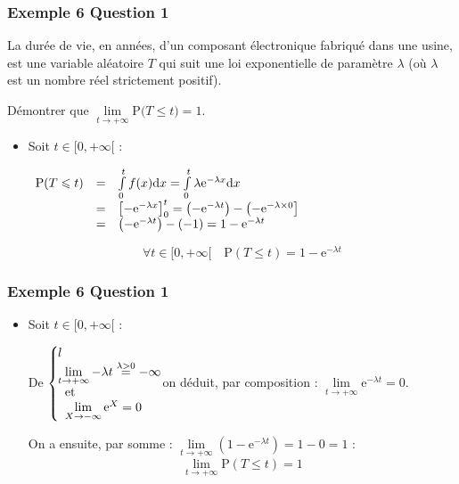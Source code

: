 \documentclass[xcolor=svgnames,t,final]{beamer}
\newcommand{\proba}[1]{\text{P}\big(#1\big)}
\newcommand{\sys}[2]{
\left\lbrace
 \begin{array}{l}
  \negthickspace\negthickspace #1\\
  \negthickspace\negthickspace #2\\
 \end{array}
\right.\negthickspace\negthickspace}
\begin{document}
\begin{frame}


\frametitle{Exemple 6 Question 1}
\label{exemple6}


La durée de vie, en années, d'un composant électronique fabriqué dans une usine, est une variable aléatoire $T$ qui suit une loi exponentielle de paramètre $\lambda$ (où $\lambda$ est un nombre réel strictement positif).

Démontrer que $\lim\limits_{t \to + \infty} \proba{T \leqslant t}=1$.

\begin{itemize}
\item Soit $t\in[0,+\infty[$ :

$\begin{array}[t]{lcl}
\text{P}(T\leqslant t)&=&\int\limits_{0}^{t}f(x)\text{d}x=\int\limits_{0}^{t}\lambda \text{e}^{-\lambda x}\text{d}x\\
&=&\left[ -\text{e}^{-\lambda x}\right]_{0}^{t}=\left( -\text{e}^{-\lambda t}\right)-\left( -\text{e}^{-\lambda \times 0}\right]\\ 
&=&\left( -\text{e}^{-\lambda t}\right)-(-1) =1-\text{e}^{-\lambda t}   
\end{array}$	

	
\[ \forall t\in[0,+\infty[\quad \text{P}(T\leqslant t)=1-\text{e}^{-\lambda t}\]

\end{itemize}


\end{frame}


\begin{frame}


\frametitle{Exemple 6 Question 1}


\begin{itemize}
\pause \item Soit $t\in[0,+\infty[$ :

De $\sys{l}{\lim\limits_{t\to +\infty}-\lambda t\overset{\lambda >0}{=}-\infty\\ \text{et}\\ \lim\limits_{X\to -\infty}\text{e}^X=0}$on déduit, par composition : 
$\lim\limits_{t\to +\infty}\text{e}^{-\lambda t}=0$.

On a ensuite, par somme : $\lim\limits_{t\to +\infty}(1-\text{e}^{-\lambda t})=1-0=1$ :	
\[\lim\limits_{t\to +\infty}\text{P}(T\leqslant t)=1\]	

\end{itemize}


\end{frame}
\end{document}
